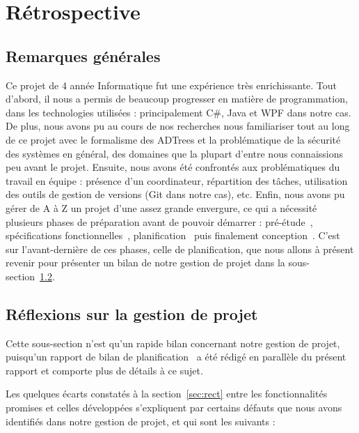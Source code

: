 \section{Rétrospective}
\label{sec:retro}


\subsection{Remarques générales}
\label{ssec:rq_gen}

Ce projet de 4\ieme{} année Informatique fut une expérience très enrichissante. Tout d'abord, il nous a permis de beaucoup progresser en matière de programmation, dans les technologies utilisées : principalement C\#, Java et WPF dans notre cas. De plus, nous avons pu au cours de nos recherches nous familiariser tout au long de ce projet avec le formalisme des ADTrees et la problématique de la sécurité des systèmes en général, des domaines que la plupart d'entre nous connaissions peu avant le projet. Ensuite, nous avons été confrontés aux problématiques du travail en équipe : présence d'un coordinateur, répartition des tâches, utilisation des outils de gestion de versions (Git dans notre cas), etc. Enfin, nous avons pu gérer de A à Z un projet d'une assez grande envergure, ce qui a nécessité plusieurs phases de préparation avant de pouvoir démarrer : pré-étude~\cite{pre_etude}, spécifications fonctionnelles~\cite{spec_fonc}, planification~\cite{planif} puis finalement conception~\cite{conception}. C'est sur l'avant-dernière de ces phases, celle de planification, que nous allons à présent revenir pour présenter un bilan de notre gestion de projet dans la {\sc sous-section}~\ref{ssec:gestionProjet}.


\subsection{Réflexions sur la gestion de projet}
\label{ssec:gestionProjet}

Cette sous-section n'est qu'un rapide bilan concernant notre gestion de projet, puisqu'un rapport de bilan de planification~\cite{bilanPlanif} a été rédigé en parallèle du présent rapport et comporte plus de détails à ce sujet.

Les quelques écarts constatés à la {\sc section}~\ref{sec:rect} entre les fonctionnalités promises et celles développées s'expliquent par certains défauts que nous avons identifiés dans notre gestion de projet, et qui sont les suivants : 

